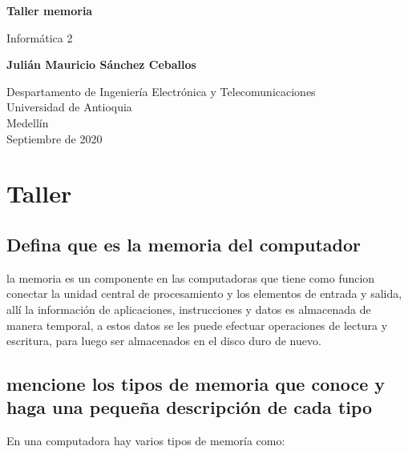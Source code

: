 \documentclass{article}
\begin{document}
\begin{titlepage}
    \begin{center}
        \vspace*{1cm}
            
        \Huge
        \textbf{Taller memoria}
            
        \vspace{0.5cm}
        \LARGE
        Informática 2
            
        \vspace{1.5cm}
            
        \textbf{Julián Mauricio Sánchez Ceballos}
            
        \vfill
            
        \vspace{0.8cm}
            
        \Large
        Despartamento de Ingeniería Electrónica y Telecomunicaciones\\
        Universidad de Antioquia\\
        Medellín\\
        Septiembre de 2020
            
    \end{center}
\end{titlepage}



\section{Taller} \label{taller}

    \subsection{Defina que es la memoria del computador}
    la memoria es un componente en las computadoras que tiene como funcion conectar la unidad central de procesamiento y los elementos de entrada y salida, allí  la información de aplicaciones, instrucciones y datos es almacenada de manera temporal, a estos datos se les puede efectuar operaciones de lectura y escritura, para luego ser almacenados en el disco duro de nuevo. 
    
    \subsection{mencione los tipos de memoria que conoce y haga una pequeña descripción de cada tipo}
    En una computadora hay varios tipos de memoría como: 
    
\end{document}
